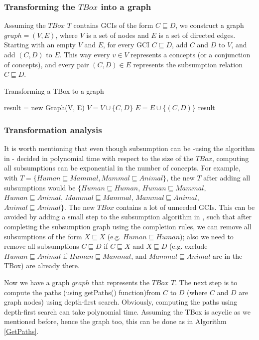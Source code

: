 \subsubsection{Transforming the $TBox$ into a graph}
Assuming the $TBox$ $T$ contains GCIs of the form $C \sqsubseteq D$, we construct a graph $graph=(V, E)$, where $V$ is a set of nodes and $E$ is a set of directed edges. Starting with an empty $V$ and $E$, for every GCI $C \sqsubseteq D$, add $C$ and $D$ to $V$, and add $(C, D)$ to $E$. This way every $v \in V$ represents a concepts (or a conjunction of concepts), and every pair $(C, D) \in E$ represents the subsumption relation $C \sqsubseteq D$.

\begin{algorithm}
\caption{Transforming a TBox to a graph}
\label{Transformation}
\begin{algorithmic}[1]
\State result = new Graph(V, E)
\State $V = V \cup \{C, D\}$
\State $E = E \cup \{(C, D)\}$
\EndFor
\State \Return result
\EndFunction
\end{algorithmic}
\end{algorithm}

\subsubsection{Transformation analysis}
It is worth mentioning that even though subsumption can be -using the algorithm in \cite{small}- decided in polynomial time with respect to the size of the $TBox$, computing all subsumptions can be exponential in the number of concepts. For example, with $T = \{Human \sqsubseteq Mammal, Mammal \sqsubseteq Animal\}$, the new $T$ after adding all subsumptions would be $\{Human \sqsubseteq Human$, $Human \sqsubseteq Mammal$, $Human \sqsubseteq Animal$, $Mammal \sqsubseteq Mammal$, $Mammal \sqsubseteq Animal$, $Animal \sqsubseteq Animal\}$. The new $TBox$ contains a lot of unneeded GCIs. This can be avoided by adding a small step to the subsumption algorithm in \cite{small}, such that after completing the subsumption graph using the completion rules, we can remove all subsumptions of the form $X \sqsubseteq X$ (e.g. $Human \sqsubseteq Human$); also we need to remove all subsumptions $C \sqsubseteq D$ if $C \sqsubseteq X$ and $X \sqsubseteq D$ (e.g. exclude $Human \sqsubseteq Animal$ if $Human \sqsubseteq Mammal$, and $Mammal \sqsubseteq Animal$ are in the TBox) are already there.

Now we have a graph $graph$ that represents the $TBox$ $T$. The next step is to compute the paths (using getPaths() function)from $C$ to $D$ (where $C$ and $D$ are graph nodes) using depth-first search. Obviously, computing the paths using depth-first search can take polynomial time. Assuming the TBox is acyclic as we mentioned before, hence the graph too, this can be done as in Algorithm \ref{GetPaths}.

